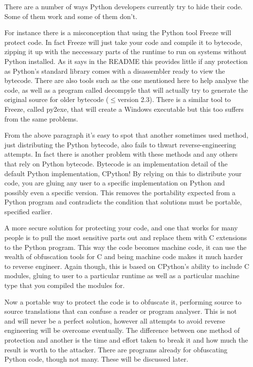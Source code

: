 \documentclass{report}
\begin{document}
There are a number of ways Python developers currently try to hide their code. Some of them work and some of
them don't.

For instance there is a misconception that using the Python tool Freeze will protect code. In fact Freeze will
just take your code and compile it to bytecode, zipping it up with the neccessary parts of the runtime to run
on systems without Python installed. As it says in the README\cite{freezereadme} this provides little if any
protection as Python's standard library comes with a disassembler ready to view the bytecode. There are also
tools such as the one mentioned here\cite{pirates} to help analyse the code, as well as a program called
decompyle\cite{decompyle} that will actually try to generate the original source for older bytecode ($\le$version
2.3). There is a similar tool to Freeze, called py2exe\cite{py2exe}, that will create a Windows executable but
this too suffers from the same problems.

From the above paragraph it's easy to spot that another sometimes used method, just distributing the Python
bytecode, also fails to thwart reverse-engineering attempts. In fact there is another problem
with these methods and any others that rely on Python bytecode. Bytecode is an implementation detail\cite{dis}
of the default Python implementation, CPython! By relying on this to distribute your code, you are gluing any
user to a specific implementation on Python and possibly even a specific version. This removes the portability
expected from a Python program and contradicts the condition that solutions must be portable, specified earlier.

A more secure solution for protecting your code, and one that works for many people is to pull the most
sensitive parts out and replace them with C extensions to the Python program. This way the code becomes machine
code, it can use the wealth of obfuscation tools for C and being machine code makes it much
harder to reverse engineer. Again though, this is based on CPython's ability to include C modules, gluing to
user to a particular runtime as well as a particular machine type that you compiled the modules for.

Now a portable way to protect the code is to obfuscate it, performing source to source translations that can
confuse a reader or program analyser. This is not and will never be a perfect solution, however all attempts
to avoid reverse engineering will be overcome eventually. The difference between one method of protection and
another is the time and effort taken to break it and how much the result is worth to the attacker. There are
programs already for obfuscating Python code, though not many. These will be discussed later.
\end{document}

